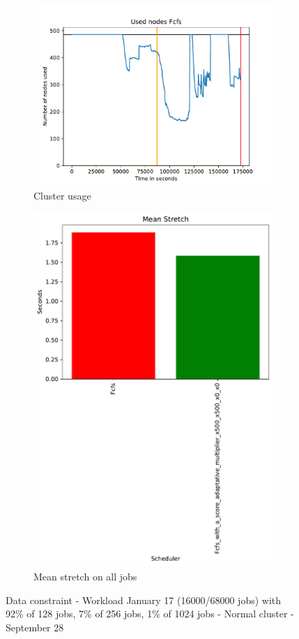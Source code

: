 \documentclass[a4paper]{article}
\begin{document}
\begin{figure}[H]\centering
\begin{subfigure}[b]{0.4\linewidth}\centering\includegraphics[width=0.9\linewidth]{MBSS/plot/2022-01-17->2022-01-17_V9271_Fcfs_Used_nodes_450_128_32_256_4_1024.pdf}\caption{Cluster usage}\end{subfigure}
\begin{subfigure}[b]{0.4\linewidth}\centering\includegraphics[width=0.9\linewidth]{MBSS/plot/Results_FCFS_Score_Adaptative_Multiplier_2022-01-17->2022-01-17_V9271_Mean_Stretch_450_128_32_256_4_1024.pdf}\caption{Mean stretch on all jobs}\end{subfigure}
\caption{Data constraint - Workload January 17 (16000/68000 jobs) with 92\% of 128 jobs, 7\% of 256 jobs, 1\% of 1024 jobs - Normal cluster - September 28}\end{figure}
\end{document}
